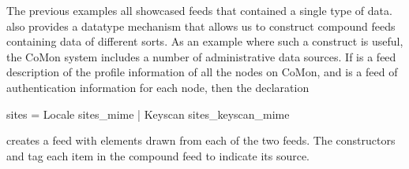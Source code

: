 The previous examples all showcased feeds that contained a single type
of data.  \padsd{} also provides a datatype mechanism that allows us
to construct compound feeds containing data of different sorts.  
As an example where such a construct is useful, the CoMon system includes a
number of administrative data sources.  
If  is a feed description of the profile
information of all the nodes on CoMon, and  is 
a feed of authentication information for each node, then the declaration
%
\begin{code}
 sites = 
    Locale  sites_mime
  | Keyscan  sites_keyscan_mime
\end{code}
%
creates a feed with elements drawn from each of the two 
feeds.  The constructors  and  tag each item in
the compound feed to indicate its source. 


